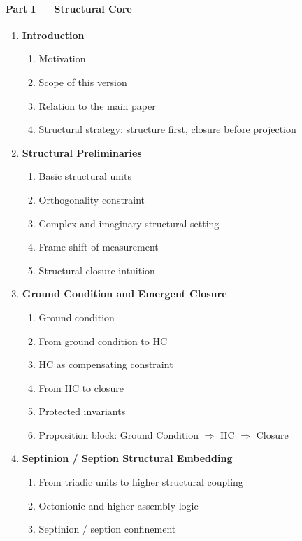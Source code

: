 \documentclass[12pt,a4paper]{article}
\begin{document}
\paragraph{Part I --- Structural Core}
\begin{enumerate}[leftmargin=2em,label=\arabic*.]
 \item \textbf{Introduction}
 \begin{enumerate}[label*=\arabic*., leftmargin=2.5em]
 \item Motivation
 \item Scope of this version
 \item Relation to the main paper
 \item Structural strategy: structure first, closure before projection
 \end{enumerate}
 \item \textbf{Structural Preliminaries}
 \begin{enumerate}[label*=\arabic*., leftmargin=2.5em]
 \item Basic structural units
 \item Orthogonality constraint
 \item Complex and imaginary structural setting
 \item Frame shift of measurement
 \item Structural closure intuition
 \end{enumerate}
 \item \textbf{Ground Condition and Emergent Closure}
 \begin{enumerate}[label*=\arabic*., leftmargin=2.5em]
 \item Ground condition
 \item From ground condition to HC
 \item HC as compensating constraint
 \item From HC to closure
 \item Protected invariants
 \item Proposition block: Ground Condition $\Rightarrow$ HC $\Rightarrow$ Closure
 \end{enumerate}
 \item \textbf{Septinion / Seption Structural Embedding}
 \begin{enumerate}[label*=\arabic*., leftmargin=2.5em]
 \item From triadic units to higher structural coupling
 \item Octonionic and higher assembly logic
 \item Septinion / seption confinement

\end{enumerate}
\end{enumerate}
\end{document}
